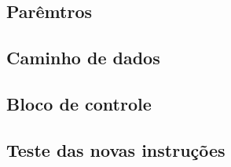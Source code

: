 \documentclass[12pt]{article}
\begin{document}
\subsection{Parêmtros}
\label{subsec:param}


\subsection{Caminho de dados}
\label{subsec:datapath}


\subsection{Bloco de controle}
\label{subsec:control}


\subsection{Teste das novas instruções}
\label{subsec:testeisa}




\end{document}
